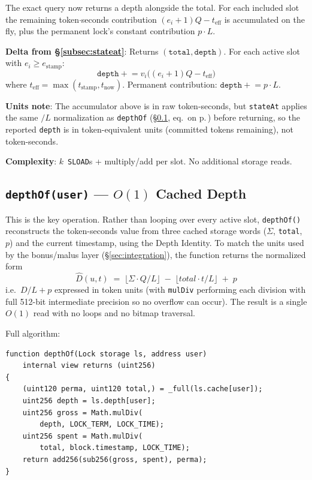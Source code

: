 \documentclass[10pt,a4paper,twocolumn]{article}
\begin{document}
The exact query now returns a depth alongside the total.  For each included slot the remaining token$\cdot$seconds contribution $(e_i{+}1)Q - t_{\text{eff}}$ is accumulated on the fly, plus the permanent lock's constant contribution $p \cdot L$.

\textbf{Delta from \S\ref{subsec:stateat}}: Returns $(\texttt{total}, \texttt{depth})$. For each active slot with $e_i \geq e_{\text{stamp}}$:
\[
\texttt{depth} \mathrel{+}= v_i \bigl((e_i{+}1)Q - t_{\text{eff}}\bigr)
\]
where $t_{\text{eff}} = \max(t_{\text{stamp}}, t_{\text{now}})$. Permanent contribution: $\texttt{depth} \mathrel{+}= p \cdot L$.

\textbf{Units note}: The accumulator above is in raw token-seconds, but \texttt{stateAt} applies the same $/L$ normalization as \texttt{depthOf} (\S\ref{subsec:depthof}, eq.\ on p.\,\pageref{subsec:depthof}) before returning, so the reported \texttt{depth} is in token-equivalent units (committed tokens remaining), not token-seconds.

\textbf{Complexity}: $k$~\texttt{SLOAD}s + multiply/add per slot. No additional storage reads.

\subsection{\texttt{depthOf(user)} --- $O(1)$ Cached Depth}
\label{subsec:depthof}

This is the key operation.  Rather than looping over every active slot, \texttt{depthOf()} reconstructs the token-seconds value from three cached storage words ($\Sigma$, \texttt{total}, $p$) and the current timestamp, using the Depth Identity.  To match the units used by the bonus/malus layer (\S\ref{sec:integration}), the function returns the normalized form
\[
\widehat{D}(u,t) \;=\; \bigl\lfloor \Sigma \cdot Q / L \bigr\rfloor \;-\; \bigl\lfloor \mathit{total}\cdot t / L \bigr\rfloor \;+\; p
\]
i.e.\ $D/L + p$ expressed in token units (with \texttt{mulDiv} performing each division with full 512-bit intermediate precision so no overflow can occur). The result is a single $O(1)$ read with no loops and no bitmap traversal.

Full algorithm:

\begin{lstlisting}[language=Solidity, caption={\texttt{depthOf} implementation}, label={lst:depthof}]
function depthOf(Lock storage ls, address user)
    internal view returns (uint256)
{
    (uint120 perma, uint120 total,) = _full(ls.cache[user]);
    uint256 depth = ls.depth[user];
    uint256 gross = Math.mulDiv(
        depth, LOCK_TERM, LOCK_TIME);
    uint256 spent = Math.mulDiv(
        total, block.timestamp, LOCK_TIME);
    return add256(sub256(gross, spent), perma);
}
\end{lstlisting}
\end{document}
